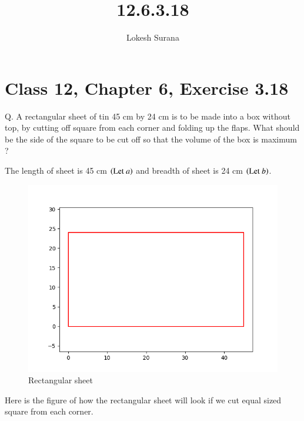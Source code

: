 \documentclass[journal,12pt,twocolumn]{IEEEtran}
\begin{document}
\vspace{3cm}
\title{12.6.3.18}
\author{Lokesh Surana}
\maketitle
\section*{Class 12, Chapter 6, Exercise 3.18}

Q. A rectangular sheet of tin 45 cm by 24 cm is to be made into a box without top, by cutting off square from each corner and folding up the flaps. What should be the side of the square to be cut off so that the volume of the box is maximum ?

\solution The length of sheet is 45 cm $\left(\text{Let } a\right)$ and breadth of sheet is 24 cm $\left(\text{Let }b\right)$.

\begin{figure}[!htb]
    \centering
    \includegraphics[width=\columnwidth]{figs/rectangle1.png}
    \caption{Rectangular sheet}
    \label{fig:rectangular sheet}
\end{figure}

Here is the figure of how the rectangular sheet will look if we cut equal sized square from each corner.
\end{document}
